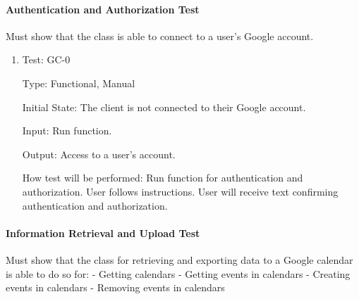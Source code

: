 \documentclass[12pt, titlepage]{article}
\begin{document}
\paragraph{Authentication and Authorization Test}
Must show that the class is able to connect to a user's Google account.
\begin{enumerate}

\item{Test: GC-0\\}

Type: Functional, Manual
					
Initial State: The client is not connected to their Google account. 
					
Input: Run function.
					
Output: Access to a user's account.
					
How test will be performed: Run function for authentication and authorization. 
User follows instructions. 
User will receive text confirming authentication and authorization.
\end{enumerate}

\paragraph{Information Retrieval and Upload Test}

Must show that the class for retrieving and exporting data to a Google calendar is able to do so for:
- Getting calendars
- Getting events in calendars
- Creating events in calendars
- Removing events in calendars
\end{document}
